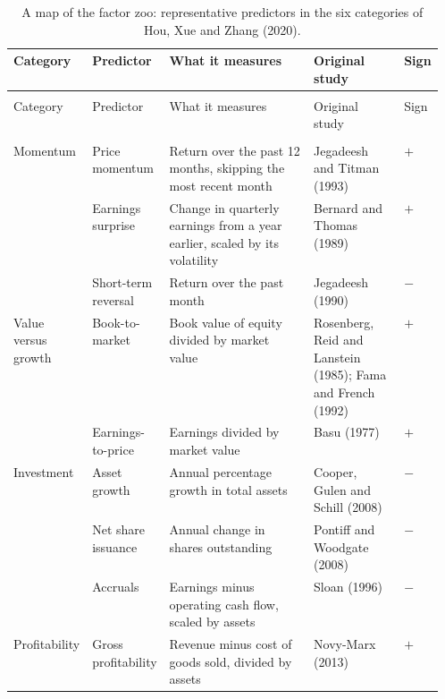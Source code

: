 \begingroup
\small


\renewcommand{\arraystretch}{1.15}
\setlength{\LTpre}{6pt}\setlength{\LTpost}{6pt}
\begin{longtable}{@{}>{\raggedright\arraybackslash}p{0.13\linewidth}>{\raggedright\arraybackslash}p{0.17\linewidth}>{\raggedright\arraybackslash}p{}>{\raggedright\arraybackslash}p{0.21\linewidth}>{\centering\arraybackslash}p{0.05\linewidth}@{}}
\caption{A map of the factor zoo: representative predictors in the six categories of Hou, Xue and Zhang (2020).}
\label{tab:19-zoo} \\
\toprule
Category & Predictor & What it measures & Original study & Sign \\
\midrule
\endfirsthead
\multicolumn{5}{@{}l}{\emph{(continued)}} \\
\toprule
Category & Predictor & What it measures & Original study & Sign \\
\midrule
\endhead
\midrule
\multicolumn{5}{r@{}}{\emph{(continued on the next page)}} \\
\endfoot
\bottomrule
\endlastfoot
Momentum & Price momentum & Return over the past 12 months, skipping the most recent month & Jegadeesh and Titman (1993) & $+$ \\
 & Earnings surprise & Change in quarterly earnings from a year earlier, scaled by its volatility & Bernard and Thomas (1989) & $+$ \\
 & Short-term reversal & Return over the past month & Jegadeesh (1990) & $-$ \\
\addlinespace
Value versus growth & Book-to-market & Book value of equity divided by market value & Rosenberg, Reid and Lanstein (1985); Fama and French (1992) & $+$ \\
 & Earnings-to-price & Earnings divided by market value & Basu (1977) & $+$ \\
\addlinespace
Investment & Asset growth & Annual percentage growth in total assets & Cooper, Gulen and Schill (2008) & $-$ \\
 & Net share issuance & Annual change in shares outstanding & Pontiff and Woodgate (2008) & $-$ \\
 & Accruals & Earnings minus operating cash flow, scaled by assets & Sloan (1996) & $-$ \\
\addlinespace
Profitability & Gross profitability & Revenue minus cost of goods sold, divided by assets & Novy-Marx (2013) & $+$ \\

\end{longtable}
